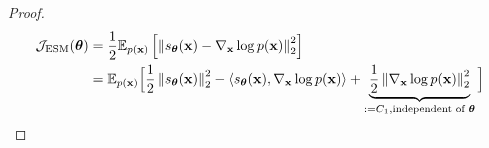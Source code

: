 \begin{proof}
	\begin{equation*}
		\begin{aligned}
			\mathcal{J}_{\text{ESM}}(\boldsymbol{\theta}) & =\frac{1}{2}\mathbb{E}_{p(\mathbf{x})}\left[\left\|s_{\boldsymbol{\theta}}(\mathbf{x})-\nabla_{\mathbf{x}}\log p(\mathbf{x})\right\|_{2}^{2}\right]                                                                                                                                                              \\
			                            & = \mathbb{E}_{p(\mathbf{x})}\Big[\frac{1}{2}\left\|s_{\boldsymbol{\theta}}(\mathbf{x})\right\|_{2}^{2}-\left\langle s_{\boldsymbol{\theta}}(\mathbf{x}),\nabla_{\mathbf{x}}\log p(\mathbf{x})\right\rangle+\underbrace{\frac{1}{2}\left\|\nabla_{\mathbf{x}}\log p(\mathbf{x})\right\|_{2}^{2}}_{:=C_{1},\text{independent of }\boldsymbol{\theta}}\Big]
		\end{aligned}
	\end{equation*}


\end{proof}

